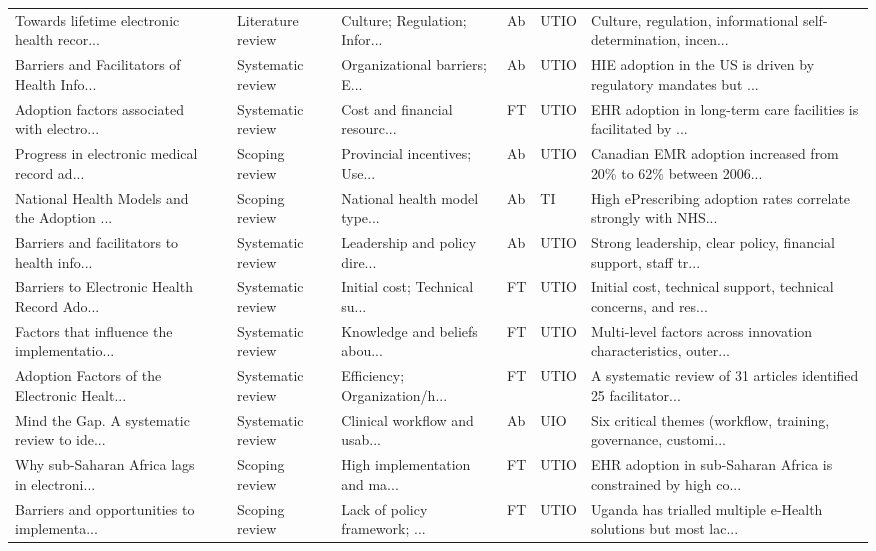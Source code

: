 \begin{longtable}{p{3.4cm} >{\centering\arraybackslash}p{0.7cm} p{1.9cm} p{2.4cm} >{\centering\arraybackslash}p{0.8cm} >{\centering\arraybackslash}p{1.1cm} p{3.4cm}}
Towards lifetime electronic health recor... & 2015 & Literature review & Culture; Regulation; Infor... & Ab & UTIO & Culture, regulation, informational self-determination, incen... \\
Barriers and Facilitators of Health Info... & 2015 & Systematic review & Organizational barriers; E... & Ab & UTIO & HIE adoption in the US is driven by regulatory mandates but ... \\
Adoption factors associated with electro... & 2015 & Systematic review & Cost and financial resourc... & FT & UTIO & EHR adoption in long-term care facilities is facilitated by ... \\
Progress in electronic medical record ad... & 2015 & Scoping review & Provincial incentives; Use... & Ab & UTIO & Canadian EMR adoption increased from 20\% to 62\% between 2006... \\
National Health Models and the Adoption ... & 2015 & Scoping review & National health model type... & Ab & TI & High ePrescribing adoption rates correlate strongly with NHS... \\
Barriers and facilitators to health info... & 2016 & Systematic review & Leadership and policy dire... & Ab & UTIO & Strong leadership, clear policy, financial support, staff tr... \\
Barriers to Electronic Health Record Ado... & 2016 & Systematic review & Initial cost; Technical su... & FT & UTIO & Initial cost, technical support, technical concerns, and res... \\
Factors that influence the implementatio... & 2016 & Systematic review & Knowledge and beliefs abou... & FT & UTIO & Multi-level factors across innovation characteristics, outer... \\
Adoption Factors of the Electronic Healt... & 2016 & Systematic review & Efficiency; Organization/h... & FT & UTIO & A systematic review of 31 articles identified 25 facilitator... \\
Mind the Gap. A systematic review to ide... & 2016 & Systematic review & Clinical workflow and usab... & Ab & UIO & Six critical themes (workflow, training, governance, customi... \\
Why sub-Saharan Africa lags in electroni... & 2017 & Scoping review & High implementation and ma... & FT & UTIO & EHR adoption in sub-Saharan Africa is constrained by high co... \\
Barriers and opportunities to implementa... & 2017 & Scoping review & Lack of policy framework; ... & FT & UTIO & Uganda has trialled multiple e-Health solutions but most lac... \\

\end{longtable}
